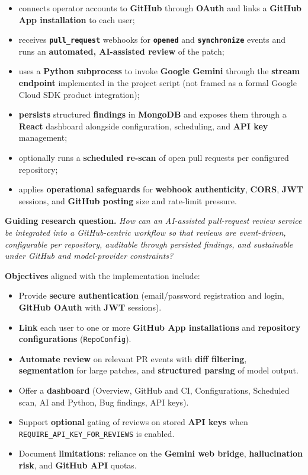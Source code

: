 \documentclass[11pt,a4paper]{report}
\begin{document}
\begin{itemize}
\item connects operator accounts to \textbf{GitHub} through \textbf{OAuth} and links a \textbf{GitHub App installation} to each user;
\item receives \textbf{\texttt{pull\_request}} webhooks for \textbf{\texttt{opened}} and \textbf{\texttt{synchronize}} events and runs an \textbf{automated, AI-assisted review} of the patch;
\item uses a \textbf{Python subprocess} to invoke \textbf{Google Gemini} through the \textbf{stream endpoint} implemented in the project script (not framed as a formal Google Cloud SDK product integration);
\item \textbf{persists} structured \textbf{findings} in \textbf{MongoDB} and exposes them through a \textbf{React} dashboard alongside configuration, scheduling, and \textbf{API key} management;
\item optionally runs a \textbf{scheduled re-scan} of open pull requests per configured repository;
\item applies \textbf{operational safeguards} for \textbf{webhook authenticity}, \textbf{CORS}, \textbf{JWT} sessions, and \textbf{GitHub posting} size and rate-limit pressure.
\end{itemize}


\textbf{Guiding research question.} \textit{How can an AI-assisted pull-request review service be integrated into a GitHub-centric workflow so that reviews are event-driven, configurable per repository, auditable through persisted findings, and sustainable under GitHub and model-provider constraints?}


\textbf{Objectives} aligned with the implementation include:


\begin{itemize}
\item Provide \textbf{secure authentication} (email/password registration and login, \textbf{GitHub OAuth} with \textbf{JWT} sessions).
\item \textbf{Link} each user to one or more \textbf{GitHub App installations} and \textbf{repository configurations} (\texttt{RepoConfig}).
\item \textbf{Automate review} on relevant PR events with \textbf{diff filtering}, \textbf{segmentation} for large patches, and \textbf{structured parsing} of model output.
\item Offer a \textbf{dashboard} (Overview, GitHub and CI, Configurations, Scheduled scan, AI and Python, Bug findings, API keys).
\item Support \textbf{optional} gating of reviews on stored \textbf{API keys} when \texttt{REQUIRE\_API\_KEY\_FOR\_REVIEWS} is enabled.
\item Document \textbf{limitations}: reliance on the \textbf{Gemini web bridge}, \textbf{hallucination risk}, and \textbf{GitHub API} quotas.
\end{itemize}
\end{document}
